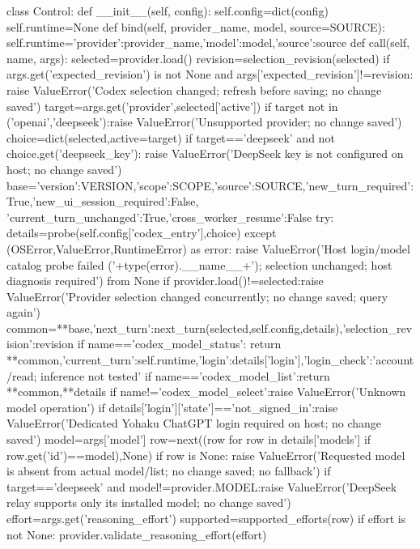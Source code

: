 class Control:
    def __init__(self, config):
        self.config=dict(config)
        self.runtime=None
    def bind(self, provider_name, model, source=SOURCE):
        self.runtime={'provider':provider_name,'model':model,'source':source}
    def call(self, name, args):
        selected=provider.load()
        revision=selection_revision(selected)
        if args.get('expected_revision') is not None and args['expected_revision']!=revision:
            raise ValueError('Codex selection changed; refresh before saving; no change saved')
        target=args.get('provider',selected['active'])
        if target not in ('openai','deepseek'):raise ValueError('Unsupported provider; no change saved')
        choice=dict(selected,active=target)
        if target=='deepseek' and not choice.get('deepseek_key'):
            raise ValueError('DeepSeek key is not configured on host; no change saved')
        base={'version':VERSION,'scope':SCOPE,'source':SOURCE,'new_turn_required':True,'new_ui_session_required':False,
              'current_turn_unchanged':True,'cross_worker_resume':False}
        try:
            details=probe(self.config['codex_entry'],choice)
        except (OSError,ValueError,RuntimeError) as error:
            raise ValueError('Host login/model catalog probe failed ('+type(error).__name__+'); selection unchanged; host diagnosis required') from None
        if provider.load()!=selected:raise ValueError('Provider selection changed concurrently; no change saved; query again')
        common={**base,'next_turn':next_turn(selected,self.config,details),'selection_revision':revision}
        if name=='codex_model_status':
            return {**common,'current_turn':self.runtime,'login':details['login'],'login_check':'account/read; inference not tested'}
        if name=='codex_model_list':return {**common,**details}
        if name!='codex_model_select':raise ValueError('Unknown model operation')
        if details['login']['state']=='not_signed_in':raise ValueError('Dedicated Yohaku ChatGPT login required on host; no change saved')
        model=args['model']
        row=next((row for row in details['models'] if row.get('id')==model),None)
        if row is None:
            raise ValueError('Requested model is absent from actual model/list; no change saved; no fallback')
        if target=='deepseek' and model!=provider.MODEL:raise ValueError('DeepSeek relay supports only its installed model; no change saved')
        effort=args.get('reasoning_effort')
        supported=supported_efforts(row)
        if effort is not None:
            provider.validate_reasoning_effort(effort)
